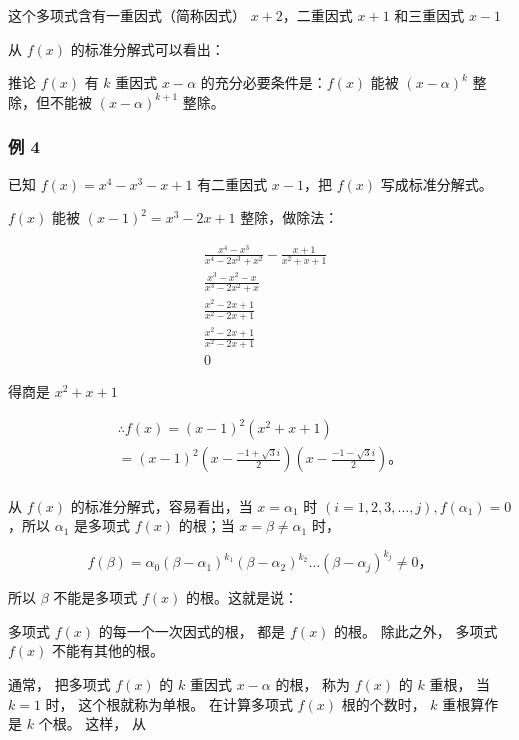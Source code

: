 这个多项式含有一重因式（简称因式） \(x + 2\)，二重因式 \(x + 1\)
和三重因式 \(x - 1\)

从 \(f(x)\) 的标准分解式可以看出：

推论 \(f(x)\) 有 \(k\) 重因式 \(x - \alpha\) 的充分必要条件是：\(f(x)\)
能被 \((x - \alpha)^k\) 整除，但不能被 \((x - \alpha)^{k + 1}\) 整除。

\subsubsection{例 4}

已知 \(f(x) = x^4 - x^3 - x + 1\) 有二重因式 \(x - 1\)，把 \(f(x)\)
写成标准分解式。

 \(f(x)\) 能被 \((x - 1)^{2} = x^{3} - 2x + 1\)
整除，做除法：

\[
\begin{array}{rl} & \frac {x ^ {4} - x ^ {3}}{x ^ {4} - 2 x ^ {3} + x ^ {2}} - \frac {x + 1}{x ^ {2} + x + 1} \\ & \frac {x ^ {3} - x ^ {2} - x}{x ^ {3} - 2 x ^ {2} + x} \\ & \frac {x ^ {2} - 2 x + 1}{x ^ {2} - 2 x + 1} \\ & \frac {x ^ {2} - 2 x + 1}{x ^ {2} - 2 x + 1} \\ & 0 \end{array}
\]

得商是 \(x^{2} + x + 1\)

\[
\begin{array}{l} \therefore f (x) = (x - 1) ^ {2} \left(x ^ {2} + x + 1\right) \\ = (x - 1) ^ {2} \left(x - \frac {- 1 + \sqrt {3} i}{2}\right) \left(x - \frac {- 1 - \sqrt {3} i}{2}\right)\text{。} \\ \end{array}
\]

从 \(f(x)\) 的标准分解式，容易看出，当 \(x = \alpha_{1}\) 时
\((i = 1, 2, 3, \dots, j), f(\alpha_{1}) = 0\)，所以 \(\alpha_{1}\)
是多项式 \(f(x)\) 的根；当 \(x = \beta \neq \alpha_{1}\) 时，

\[
f (\beta) = \alpha_ {0} (\beta - \alpha_ {1}) ^ {k _ {1}} (\beta - \alpha_ {2}) ^ {k _ {2}} \dots (\beta - \alpha_ {j}) ^ {k _ {j}} \neq 0\text{，}
\]

所以 \(\beta\) 不能是多项式 \(f(x)\) 的根。这就是说：

多项式 \(f(x)\) 的每一个一次因式的根， 都是 \(f(x)\) 的根。 除此之外，
多项式 \(f(x)\) 不能有其他的根。

通常， 把多项式 \(f(x)\) 的 \(k\) 重因式 \(x - \alpha\) 的根， 称为
\(f(x)\) 的 \(k\) 重根， 当 \(k = 1\) 时， 这个根就称为单根。
在计算多项式 \(f(x)\) 根的个数时， \(k\) 重根算作是 \(k\) 个根。 这样，
从

